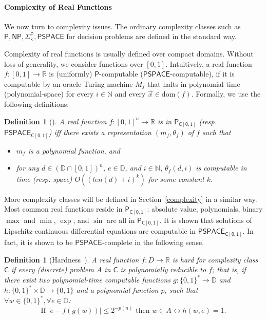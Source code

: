 \documentclass[conference]{IEEEtran}
\newtheorem{definition}[theorem]{Definition}
\newcommand{\dom}{\mathrm{dom}}
\begin{document}
\paragraph{Complexity of Real Functions} We now turn to complexity issues. The ordinary complexity classes such as $\mathsf{P, NP, \Sigma_k^P, PSPACE}$ for decision problems are defined in the standard way. 

Complexity of real functions is usually defined over compact domains. Without loss of generality, we consider functions over $[0,1]$. Intuitively, a real function $f:[0,1]\rightarrow\mathbb{R}$ is (uniformly) $\mathsf{P}$-computable ($\mathsf{PSPACE}$-computable), if it is computable by an oracle Turing machine $M_{f}$ that halts in polynomial-time (polynomial-space) for every $i\in \mathbb{N}$ and every $\vec x\in \dom(f)$. Formally, we use the following definitions:
\begin{definition}[\cite{Kobook}]
A real function $f: [0,1]^n\rightarrow \mathbb{R}$ is in $\mathsf{P_{C[0,1]}}$ (resp. $\mathsf{PSPACE_{C[0,1]}}$) iff there exists a representation $(m_f, \theta_f)$ of $f$ such that
\begin{itemize}
\item $m_f$ is a polynomial function, and 
\item for any $d\in (\mathbb{D}\cap [0,1])^n$, $e\in \mathbb{D}$, and $i\in \mathbb{N}$, $\theta_f(d,i)$ is computable in time (resp. space) $O((\mathit{len}(d)+i)^k)$ for some constant $k$.
\end{itemize}
\end{definition}
More complexity classes will be defined in Section~\ref{complexity} in a similar way. Most common real functions reside in $\mathsf{P_{C[0,1]}}$: absolute value, polynomials, binary $\max$ and $\min$, $\exp$, and $\sin$ are all in $\mathsf{P_{C[0,1]}}$. It is shown that solutions of Lipschitz-continuous differential equations are computable in $\mathsf{PSPACE_{C[0,1]}}$. In fact, it is shown to be $\mathsf{PSPACE}$-complete in the following sense. 
\begin{definition}[Hardness~\cite{Ko92}]
A real function $f: D\rightarrow \mathbb{R}$ is {\em hard} for complexity class $\mathsf{C}$ if every (discrete) problem $A$ in $\mathsf{C}$ is polynomially reducible to $f$; that is, if there exist two polynomial-time computable functions $g:\{0,1\}^*\rightarrow \mathbb{D}$ and $h:\{0,1\}^*\times \mathbb{D}\rightarrow \{0,1\}$ and a polynomial function $p$, such that $\forall w\in \{0,1\}^*,\forall e\in \mathbb{D}$:
$$\mbox{If }|e-f(g(w))|\leq 2^{-p(n)} \mbox{ then } w\in A\leftrightarrow h(w,e)=1.$$
\end{definition}
\end{document}
